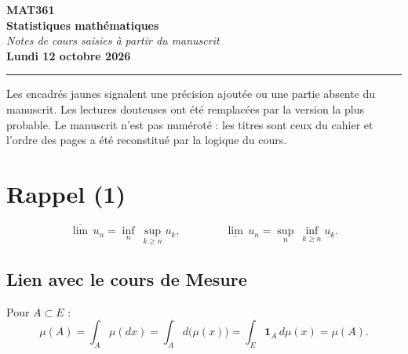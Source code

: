 \documentclass[11pt,a4paper]{article}
\newcommand{\ind}{\mathbf{1}}
\begin{document}
\begin{center}
  {\Huge\bfseries\color{bleu} MAT361}\\[4pt]
  {\LARGE\bfseries\color{bleuclair} Statistiques mathématiques}\\[4pt]
  {\large\itshape Notes de cours saisies à partir du manuscrit}\\[6pt]
  {\normalsize\bfseries Lundi 12 octobre 2026}
\end{center}
\vspace{-4pt}
\hrule
\vspace{6pt}

\begin{note}
Les encadrés jaunes signalent une précision ajoutée ou une partie absente du manuscrit. Les lectures douteuses ont été remplacées par la version la plus probable. Le manuscrit n'est pas numéroté : les titres sont ceux du cahier et l'ordre des pages a été reconstitué par la logique du cours.
\end{note}

\section*{Rappel (1)}

\[
  \overline{\lim}\,u_n=\inf_{n}\ \sup_{k\ge n}u_k ,\qquad\qquad
  \underline{\lim}\,u_n=\sup_{n}\ \inf_{k\ge n}u_k .
\]

\subsection*{Lien avec le cours de Mesure}

\begin{center}
\end{center}

Pour $A\subset E$ :
\[
  \mu(A)=\int_A\mu(dx)=\int_A d\bigl(\mu(x)\bigr)=\int_E\ind_A\,d\mu(x)=\mu(A).
\]
\end{document}

